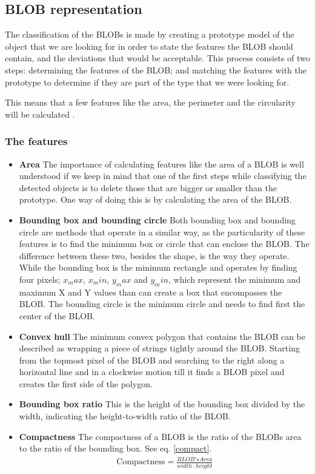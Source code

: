 {\subsection{BLOB representation}
The classification of the BLOBs is made by creating a prototype model of the object that we are looking for in order to state the features the BLOB should contain, and the deviations that would be acceptable. This process consists of two steps: determining the features of the BLOB; and matching the features with the prototype to determine if they are part of the type that we were looking for.

This means that a few features like the area, the perimeter and the circularity will be calculated \citep{ip_book}.
\subsubsection{The features}


\begin{itemize}
\item \textbf{Area}
The importance of calculating features like the area of a BLOB is well understood if we keep in mind that one of the first steps while classifying the detected objects is to delete those that are bigger or smaller than the prototype. One way of doing this is by calculating the area of the BLOB.
\item \textbf{Bounding box and bounding circle}
Both bounding box and bounding circle are methods that operate in a similar way, as the particularity of these features is to find the minimum box or circle that can enclose the BLOB. The difference between these two, besides the shape, is the way they operate. While the bounding box is the minimum rectangle and operates by finding four pixels; $x_max$, $x_min$, $y_max$ and $y_min$, which represent the minimum and maximum X and Y values than can create a box that encompasses the BLOB. The bounding circle is the minimum circle and needs to find first the center of the BLOB.
\item \textbf{Convex hull}
The minimum convex polygon that contains the BLOB can be described as wrapping a piece of strings tightly around the BLOB. Starting from the topmost pixel of the BLOB and searching to the right along a horizontal line and in a clockwise motion till it finds a BLOB pixel and creates the first side of the polygon.
\item \textbf{Bounding box ratio}
This is the height of the bounding box divided by the width, indicating the height-to-width ratio of the BLOB.
\item \textbf{Compactness}
The compactness of a BLOB is the ratio of the BLOBs area to the ratio of the bounding box. See eq. \ref{compact}.
\begin{equation}
	\begin{aligned}
	\text{Compactness}=\displaystyle\frac{BLOB's Area}{width\cdot{height}}
	\label{compact}
	\end{aligned}
\end{equation}


\end{itemize}}
